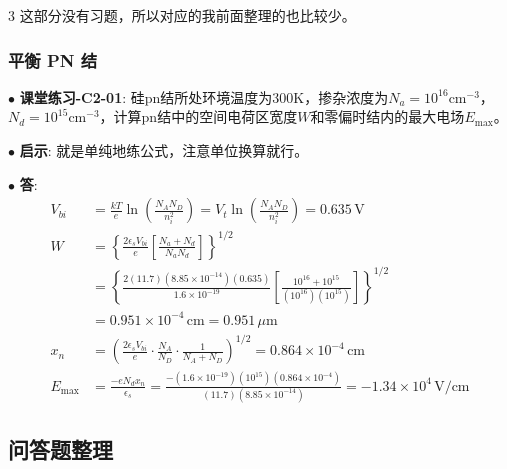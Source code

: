 \documentclass[10pt, a4paper, landscape]{article}
\newcommand{\entry}[2]{$\bullet$ \textbf{#1}: #2\par\vspace{0.5pt}}
\begin{document}
\begin{multicols*}{3}
这部分没有习题，所以对应的我前面整理的也比较少。

\subsubsection{平衡 PN 结}

\entry{课堂练习-C2-01}{硅pn结所处环境温度为300K，掺杂浓度为$N_a = 10^{16} \text{cm}^{-3}$，$N_d = 10^{15} \text{cm}^{-3}$，计算pn结中的空间电荷区宽度$W$和零偏时结内的最大电场$E_{\max}$。}

\entry{启示}{
    就是单纯地练公式，注意单位换算就行。
}

\entry{答}{
\begin{align*}
V_{bi} &= \frac{kT}{e} \ln \left( \frac{N_A N_D}{n_i^2} \right) = V_t \ln \left( \frac{N_A N_D}{n_i^2} \right) = 0.635\,\text{V} \\
W &= \left\{ \frac{2\epsilon_s V_{bi}}{e} \left[ \frac{N_a + N_d}{N_a N_d} \right] \right\}^{1/2} \\
&= \left\{ \frac{2(11.7)(8.85 \times 10^{-14})(0.635)}{1.6 \times 10^{-19}} \left[ \frac{10^{16} + 10^{15}}{(10^{16})(10^{15})} \right] \right\}^{1/2} \\
&= 0.951 \times 10^{-4}\,\text{cm} = 0.951\,\mu\text{m} \\
x_n &= \left( \frac{2\epsilon_s V_{bi}}{e} \cdot \frac{N_A}{N_D} \cdot \frac{1}{N_A + N_D} \right)^{1/2} = 0.864 \times 10^{-4}\,\text{cm} \\
E_{\max} &= \frac{-e N_d x_n}{\epsilon_s} = \frac{-(1.6 \times 10^{-19})(10^{15})(0.864 \times 10^{-4})}{(11.7)(8.85 \times 10^{-14})} = -1.34 \times 10^{4}\,\text{V/cm}
\end{align*}
}

\subsection{问答题整理}


\end{multicols*}
\end{document}
